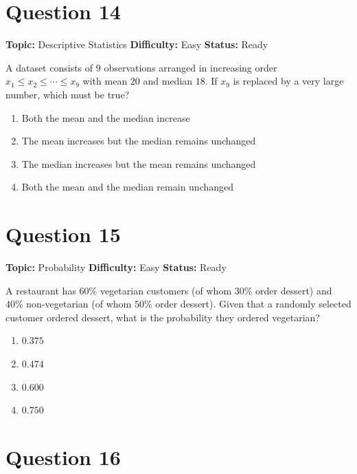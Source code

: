 \documentclass[11pt]{article}
\begin{document}
\newpage

\section*{Question 14}


\noindent\textbf{Topic:} Descriptive Statistics \quad \textbf{Difficulty:} Easy \quad \textbf{Status:} Ready



A dataset consists of $9$ observations arranged in increasing order
$x_1 \le x_2 \le \cdots \le x_9$ with mean $20$ and median $18$. If $x_9$ is
replaced by a very large number, which must be true?
\begin{enumerate}[label=(\Alph*)]
\item Both the mean and the median increase
\item The mean increases but the median remains unchanged
\item The median increases but the mean remains unchanged
\item Both the mean and the median remain unchanged
\end{enumerate}

\newpage

\section*{Question 15}


\noindent\textbf{Topic:} Probability \quad \textbf{Difficulty:} Easy \quad \textbf{Status:} Ready



A restaurant has $60\%$ vegetarian customers (of whom $30\%$ order dessert) and
$40\%$ non-vegetarian (of whom $50\%$ order dessert). Given that a randomly
selected customer ordered dessert, what is the probability they ordered vegetarian?
\begin{enumerate}[label=(\Alph*)]
\item $0.375$ \item $0.474$ \item $0.600$ \item $0.750$
\end{enumerate}

\newpage

\section*{Question 16}
\end{document}

